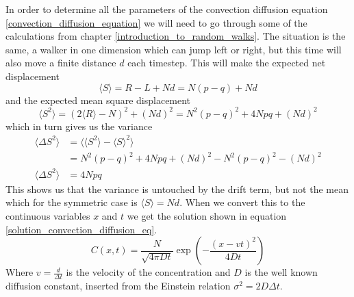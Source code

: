 In order to determine all the parameters of the convection diffusion equation \ref{convection_diffusion_equation} we will need to go through some of the calculations from chapter \ref{introduction_to_random_walks}. 
The situation is the same, a walker in one dimension which can jump left or right, but this time will also move a finite distance $d$ each timestep. 
This will make the expected net displacement
\begin{equation*}
 \langle S\rangle = R-L +Nd = N(p-q) + Nd
\end{equation*}
and the expected mean square displacement
\begin{equation*}
 \langle S^2\rangle = (2\langle R\rangle -N)^2 +(Nd)^2 = N^2(p-q)^2 +4Npq +(Nd)^2
\end{equation*}
which in turn gives us the variance
\begin{align*}
 \langle \Delta S^2\rangle &= \langle\langle S^2\rangle-\langle S\rangle^2\rangle \\
 &= N^2(p-q)^2 +4Npq +(Nd)^2 - N^2(p-q)^2 -(Nd)^2 \\
\langle \Delta S^2\rangle &= 4Npq
\end{align*}
This shows us that the variance is untouched by the drift term, but not the mean which for the symmetric case is $\langle S\rangle = Nd$. 
When we convert this to the continuous variables $x$ and $t$ we get the solution shown in equation \ref{solution_convection_diffusion_eq}.
\begin{equation}\label{solution_convection_diffusion_eq}
 C(x,t) = \frac{N}{\sqrt{4\pi Dt}}\exp\left(-\frac{(x-vt)^2}{4Dt}\right)
\end{equation}
Where $v = \frac{d}{\Delta t}$ is the velocity of the concentration and $D$ is the well known diffusion constant, inserted from the Einstein relation $\sigma^2 = 2D\Delta t$.\\


